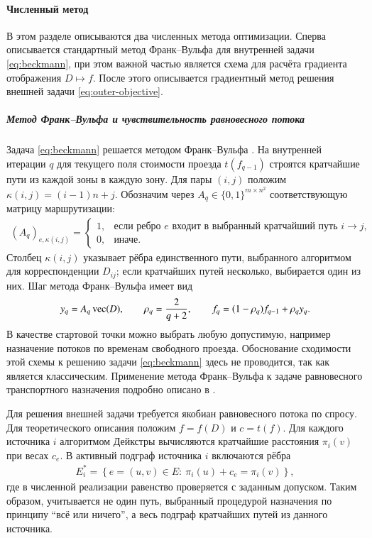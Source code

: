 \documentclass{crm-article}
\begin{document}
\paragraph{Численный метод}

В этом разделе описываются два численных метода оптимизации. Сперва
описывается стандартный метод Франк--Вульфа для внутренней задачи
\eqref{eq:beckmann}, при этом важной частью является схема для расчёта
градиента отображения $D\mapsto f$. После этого описывается градиентный метод решения внешней задачи \eqref{eq:outer-objective}. 
\subparagraph{Метод Франк--Вульфа и чувствительность равновесного потока}

Задача \eqref{eq:beckmann} решается методом Франк--Вульфа
\cite{FrankWolfe1956}. На внутренней итерации $q$ для текущего поля стоимости проезда
$t(f_{q-1})$ строятся кратчайшие пути из каждой зоны в каждую зону. Для пары
$(i,j)$ положим $\kappa(i,j)=(i-1)n+j$. Обозначим через
$A_q\in\{0,1\}^{m\times n^2}$ соответствующую матрицу маршрутизации:
\begin{gather}
 (A_q)_{e,\kappa(i,j)}=
 \begin{cases}
 1,&\text{если ребро $e$ входит в выбранный кратчайший путь $i\to j$},\\
 0,&\text{иначе}.
 \end{cases}
 \label{eq:routing-matrix}
\end{gather}
Столбец $\kappa(i,j)$ указывает рёбра единственного пути, выбранного
алгоритмом для корреспонденции $D_{ij}$; если кратчайших путей несколько,
выбирается один из них. Шаг метода Франк--Вульфа имеет вид
\begin{gather}
 y_q=A_q\mathop{\rm vec}(D),\qquad
 \rho_q=\frac{2}{q+2},\qquad
 f_q=(1-\rho_q)f_{q-1}+\rho_q y_q.
 \label{eq:fw}
\end{gather}
В качестве стартовой точки можно выбрать любую допустимую, например назначение потоков по временам свободного проезда. Обоснование
сходимости этой схемы к решению задачи \eqref{eq:beckmann} здесь не
проводится, так как является классическим. Применение метода Франк--Вульфа к задаче равновесного транспортного назначения подробно описано
в \cite{LeBlanc1975}.

Для решения внешней задачи требуется якобиан равновесного потока по спросу.
Для теоретического описания положим $f=f(D)$ и $c=t(f)$. Для каждого источника $i$ алгоритмом
Дейкстры вычисляются
кратчайшие расстояния $\pi_i(v)$ при весах $c_e$. В активный подграф
источника $i$ включаются рёбра
\begin{gather}
 E_i^*=\left\{e=(u,v)\in E:\ \pi_i(u)+c_e=\pi_i(v)\right\},
 \label{eq:active-shortest-subgraph}
\end{gather}
где в численной реализации равенство проверяется с заданным допуском. Таким
образом, учитывается не один путь, выбранный процедурой назначения по принципу
``всё или ничего'', а весь
подграф кратчайших путей из данного источника.
\end{document}
